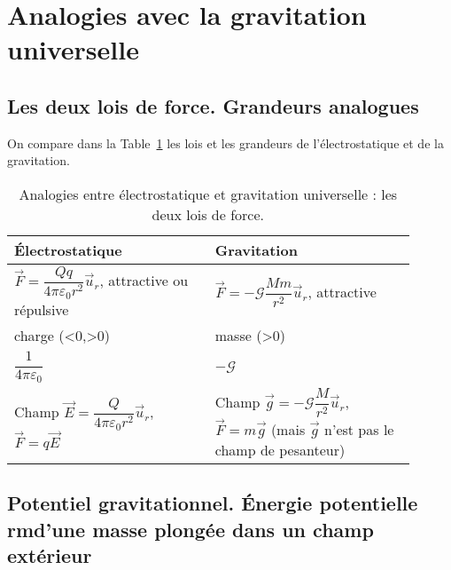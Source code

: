 \section{Analogies avec la gravitation universelle}

    \subsection{Les deux lois de force. Grandeurs analogues}

    On compare dans la Table~\ref{tab:analogie_gravitation_universelle_lois_de_force} les lois et les grandeurs de l'électrostatique et de la gravitation.
    \begin{table}
        \centering
        \begin{tabular}{p{0.45\linewidth}|p{0.45\linewidth}}
            \toprule
            Électrostatique & Gravitation \\ \midrule
            $\vec{F}=\dfrac{Qq}{4\pi\varepsilon_0 r^{2}}\vec{u}_r$, attractive ou répulsive& $\vec{F}=-\mathcal{G}\dfrac{Mm}{r^{2}}\vec{u}_r$, attractive\\ \midrule
            charge (<0,>0)& masse (>0)\\ \midrule
            $\dfrac{1}{4\pi\varepsilon_0}$&$-\mathcal{G}$\\ \midrule
            Champ $\vec{E}=\dfrac{Q}{4\pi\varepsilon_0 r^{2}}\vec{u}_r$, $\vec{F}=q\vec{E}$ & Champ $\vec{g}=-\mathcal{G}\dfrac{M}{r^{2}}\vec{u}_r$, $\vec{F}=m\vec{g}$ (mais $\vec{g}$ n'est pas le champ de pesanteur)\\ \bottomrule
        \end{tabular}    
        \caption{Analogies entre électrostatique et gravitation universelle : les deux lois de force.}
        \label{tab:analogie_gravitation_universelle_lois_de_force}
    \end{table}

    \subsection[Potentiel gravitationnel]{Potentiel gravitationnel. Énergie potentielle\\rmd'une masse plongée dans un champ extérieur}

